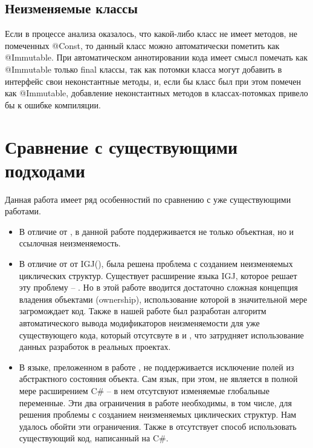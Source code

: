 \subsection{Неизменяемые классы}

Если в процессе анализа оказалось, что какой-либо класс не имеет методов, не помеченных @Const, то данный класс можно автоматически пометить как @Immutable. При автоматическом аннотировании кода имеет смысл помечать как @Immutable только final классы, так как потомки класса могут добавить в интерфейс свои неконстантные методы, и, если бы класс был при этом помечен как @Immutable, добавление неконстантных методов в классах-потомках привело бы к ошибке компиляции.

\section{Сравнение с существующими подходами}

Данная работа имеет ряд особенностий по сравнению с уже существующими работами. 

\begin{itemize}
	\item В отличие от \cite{Tschantz2006}, в данной работе поддерживается не только объектная, но и ссылочная неизменяемость.
	\item В отличие от от IGJ(\cite{Zibin2007}), была решена проблема с созданием неизменяемых циклических структур. Существует расширение языка IGJ, которое решает эту проблему -- \cite{Potanin}. Но в этой работе вводится достаточно сложная концепция владения объектами (ownership), использование которой в значительной мере загромождает код. Также в нашей работе был разработан алгоритм автоматического вывода модификаторов неизменяемости для уже существующего кода, который отсутсвуте в \cite{Zibin2007} и \cite{Potanin}, что затрудняет использование данных разработок в реальных проектах. 
	\item В языке, преложенном в работе \cite{Gordon2012}, не поддерживается исключение полей из абстрактного состояния объекта. Сам язык, при этом, не является в полной мере расширением C\# -- в нем отсутсвуют изменяемые глобальные переменные. Эти два ограничения в работе \cite{Gordon2012} необходимы, в том числе, для решения проблемы с созданием неизменяемых циклических структур. Нам удалось обойти эти ограничения. Также в \cite{Gordon2012} отсутствует способ использовать существующий код, написанный на C\#.
\end{itemize}

























